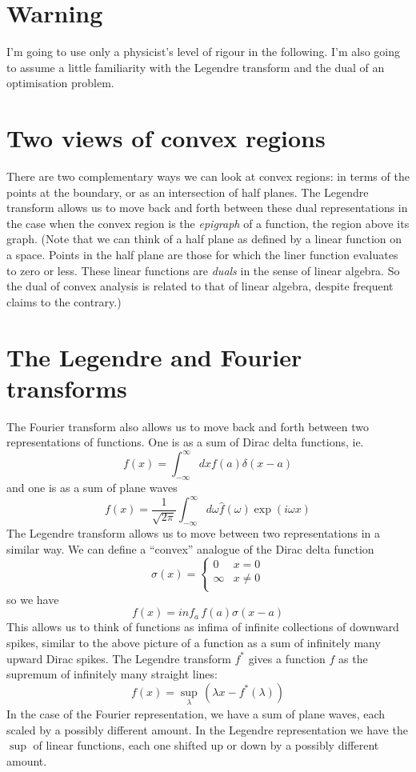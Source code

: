 \documentclass[10pt]{article}
\begin{document}
\section{Warning}
I'm going to use only a physicist's level of rigour in the following.
I'm also going to assume a little familiarity with the Legendre transform and the dual of an optimisation problem.

\section{Two views of convex regions}
There are two complementary ways we can look at convex regions: in terms of the points at the boundary, or as an intersection of half planes.
The Legendre transform allows us to move back and forth between these dual representations in the case when the convex region is the {\it epigraph} of a function, the region above its graph.
(Note that we can think of a half plane as defined by a linear function on a space.
Points in the half plane are those for which the liner function evaluates to zero or less.
These linear functions are {\it duals} in the sense of linear algebra.
So the dual of convex analysis is related to that of linear algebra, despite frequent claims to the contrary.)

\section{The Legendre and Fourier transforms}
The Fourier transform also allows us to move back and forth between two representations of functions.
One is as a sum of Dirac delta functions, ie.
\[
f(x)=\int_{-\infty}^\infty dx f(a)\delta(x-a)
\]
and one is as a sum of plane waves
\[
f(x)=\frac{1}{\sqrt{2\pi}}\int_{-\infty}^\infty d\omega \hat{f}(\omega)\exp(i\omega x)
\]
The Legendre transform allows us to move between two representations in a similar way.
We can define a ``convex'' analogue of the Dirac delta function
\[
\sigma(x)=\begin{cases}
0 & x=0 \\
\infty & x\ne 0 \\
\end{cases}
\]
so we have
\[
f(x) = inf_a\, f(a)\sigma(x-a)
\]
This allows us to think of functions as infima of infinite collections of downward spikes, similar to the above picture of a function as a sum of infinitely many upward Dirac spikes.
The Legendre transform $f^\ast$ gives a function $f$ as the supremum of infinitely many straight lines:
\[
f(x) = \sup_\lambda\, (\lambda x-f^\ast(\lambda))
\]
In the case of the Fourier representation, we have a sum of plane waves, each scaled by a possibly different amount.
In the Legendre representation we have the $\sup$ of linear functions, each one shifted up or down by a possibly different amount.
\end{document}
